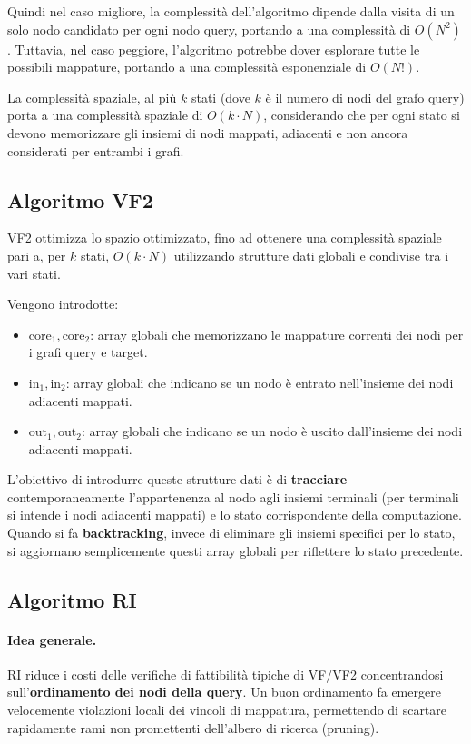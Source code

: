 Quindi nel caso migliore, la complessità dell'algoritmo dipende dalla visita di un solo nodo candidato per ogni nodo query, portando a una complessità di \(O(N^2)\). Tuttavia, nel caso peggiore, l'algoritmo potrebbe dover esplorare tutte le possibili mappature, portando a una complessità esponenziale di \(O(N!)\).

La complessità spaziale, al più $k$ stati (dove $k$ è il numero di nodi del grafo query) porta a una complessità spaziale di \(O(k \cdot N)\), considerando che per ogni stato si devono memorizzare gli insiemi di nodi mappati, adiacenti e non ancora considerati per entrambi i grafi.

\subsection{Algoritmo VF2}
VF2 ottimizza lo spazio ottimizzato, fino ad ottenere una complessità spaziale pari a, per $k$ stati, \( O(k \cdot N) \) utilizzando strutture dati globali e condivise tra i vari stati.

Vengono introdotte:
\begin{itemize}
    \item $\text{core}_1, \text{core}_2$: array globali che memorizzano le mappature correnti dei nodi per i grafi query e target.
    \item $\text{in}_1, \text{in}_2$: array globali che indicano se un nodo è entrato nell'insieme dei nodi adiacenti mappati.
    \item $\text{out}_1, \text{out}_2$: array globali che indicano se un nodo è uscito dall'insieme dei nodi adiacenti mappati.
\end{itemize}

L'obiettivo di introdurre queste strutture dati è di \textbf{tracciare} contemporaneamente l'appartenenza al nodo agli insiemi terminali (per terminali si intende i nodi adiacenti mappati) e lo stato corrispondente della computazione. Quando si fa \textbf{backtracking}, invece di eliminare gli insiemi specifici per lo stato, si aggiornano semplicemente questi array globali per riflettere lo stato precedente.

\subsection{Algoritmo RI}

\paragraph{Idea generale.}
RI riduce i costi delle verifiche di fattibilità tipiche di VF/VF2 concentrandosi
sull'\textbf{ordinamento dei nodi della query}. Un buon ordinamento fa emergere velocemente violazioni locali dei vincoli di mappatura, permettendo di scartare rapidamente rami non promettenti dell'albero di ricerca (pruning).

